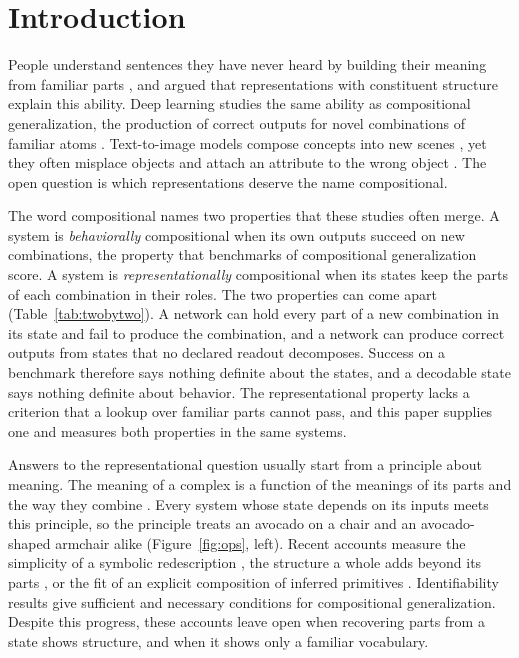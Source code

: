 \documentclass[10pt]{article}
\theoremstyle{plain}
\theoremstyle{remark}
\begin{document}
\begin{abstract}
\end{abstract}

\section{Introduction}
\label{sec:intro}

People understand sentences they have never heard by building their meaning from familiar parts \citep{frege1923}, and \citet{fodor1988} argued that representations with constituent structure explain this ability. Deep learning studies the same ability as compositional generalization, the production of correct outputs for novel combinations of familiar atoms \citep{lake2018,keysers2020,kim2020cogs}. Text-to-image models compose concepts into new scenes \citep{ramesh2021,okawa2023}, yet they often misplace objects \citep{conwell2022} and attach an attribute to the wrong object \citep{rassin2022}. The open question is which representations deserve the name compositional.

The word compositional names two properties that these studies often merge. A system is \emph{behaviorally} compositional when its own outputs succeed on new combinations, the property that benchmarks of compositional generalization score. A system is \emph{representationally} compositional when its states keep the parts of each combination in their roles. The two properties can come apart (Table~\ref{tab:twobytwo}). A network can hold every part of a new combination in its state and fail to produce the combination, and a network can produce correct outputs from states that no declared readout decomposes. Success on a benchmark therefore says nothing definite about the states, and a decodable state says nothing definite about behavior. The representational property lacks a criterion that a lookup over familiar parts cannot pass, and this paper supplies one and measures both properties in the same systems.

Answers to the representational question usually start from a principle about meaning. The meaning of a complex is a function of the meanings of its parts and the way they combine \citep{montague1970}. Every system whose state depends on its inputs meets this principle, so the principle treats an avocado on a chair and an avocado-shaped armchair alike (Figure~\ref{fig:ops}, left). Recent accounts measure the simplicity of a symbolic redescription \citep{elmoznino2024}, the structure a whole adds beyond its parts \citep{elmoznino2026}, or the fit of an explicit composition of inferred primitives \citep{andreas2019}. Identifiability results give sufficient \citep{lachapelle2023,wiedemer2024} and necessary \citep{uselis2026} conditions for compositional generalization. Despite this progress, these accounts leave open when recovering parts from a state shows structure, and when it shows only a familiar vocabulary.
\end{document}
